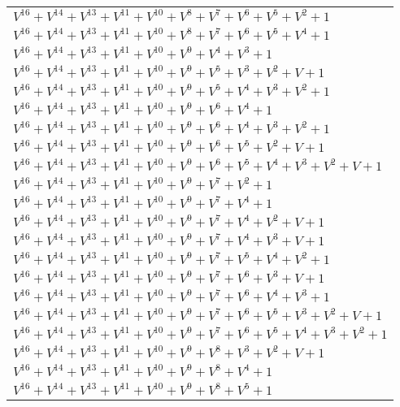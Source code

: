 \documentclass[12pt]{article}
\begin{document}
\begin{adjustwidth}{-4cm}{}
\begin{center}
\begin{longtable}{|l|}
$V^{16}  +V^{14}  +V^{13}  +V^{11}  +V^{10}  +V^{8}  +V^{7}  +V^{6}  +V^{5}  +V^{2}  + 1$ \\
$V^{16}  +V^{14}  +V^{13}  +V^{11}  +V^{10}  +V^{8}  +V^{7}  +V^{6}  +V^{5}  +V^{4}  + 1$ \\
$V^{16}  +V^{14}  +V^{13}  +V^{11}  +V^{10}  +V^{9}  +V^{4}  +V^{3}  + 1$ \\
$V^{16}  +V^{14}  +V^{13}  +V^{11}  +V^{10}  +V^{9}  +V^{5}  +V^{3}  +V^{2}  + V + 1$ \\
$V^{16}  +V^{14}  +V^{13}  +V^{11}  +V^{10}  +V^{9}  +V^{5}  +V^{4}  +V^{3}  +V^{2}  + 1$ \\
$V^{16}  +V^{14}  +V^{13}  +V^{11}  +V^{10}  +V^{9}  +V^{6}  +V^{4}  + 1$ \\
$V^{16}  +V^{14}  +V^{13}  +V^{11}  +V^{10}  +V^{9}  +V^{6}  +V^{4}  +V^{3}  +V^{2}  + 1$ \\
$V^{16}  +V^{14}  +V^{13}  +V^{11}  +V^{10}  +V^{9}  +V^{6}  +V^{5}  +V^{2}  + V + 1$ \\
$V^{16}  +V^{14}  +V^{13}  +V^{11}  +V^{10}  +V^{9}  +V^{6}  +V^{5}  +V^{4}  +V^{3}  +V^{2}  + V + 1$ \\
$V^{16}  +V^{14}  +V^{13}  +V^{11}  +V^{10}  +V^{9}  +V^{7}  +V^{2}  + 1$ \\
$V^{16}  +V^{14}  +V^{13}  +V^{11}  +V^{10}  +V^{9}  +V^{7}  +V^{4}  + 1$ \\
$V^{16}  +V^{14}  +V^{13}  +V^{11}  +V^{10}  +V^{9}  +V^{7}  +V^{4}  +V^{2}  + V + 1$ \\
$V^{16}  +V^{14}  +V^{13}  +V^{11}  +V^{10}  +V^{9}  +V^{7}  +V^{4}  +V^{3}  + V + 1$ \\
$V^{16}  +V^{14}  +V^{13}  +V^{11}  +V^{10}  +V^{9}  +V^{7}  +V^{5}  +V^{4}  +V^{2}  + 1$ \\
$V^{16}  +V^{14}  +V^{13}  +V^{11}  +V^{10}  +V^{9}  +V^{7}  +V^{6}  +V^{3}  + V + 1$ \\
$V^{16}  +V^{14}  +V^{13}  +V^{11}  +V^{10}  +V^{9}  +V^{7}  +V^{6}  +V^{4}  +V^{3}  + 1$ \\
$V^{16}  +V^{14}  +V^{13}  +V^{11}  +V^{10}  +V^{9}  +V^{7}  +V^{6}  +V^{5}  +V^{3}  +V^{2}  + V + 1$ \\
$V^{16}  +V^{14}  +V^{13}  +V^{11}  +V^{10}  +V^{9}  +V^{7}  +V^{6}  +V^{5}  +V^{4}  +V^{3}  +V^{2}  + 1$ \\
$V^{16}  +V^{14}  +V^{13}  +V^{11}  +V^{10}  +V^{9}  +V^{8}  +V^{3}  +V^{2}  + V + 1$ \\
$V^{16}  +V^{14}  +V^{13}  +V^{11}  +V^{10}  +V^{9}  +V^{8}  +V^{4}  + 1$ \\
$V^{16}  +V^{14}  +V^{13}  +V^{11}  +V^{10}  +V^{9}  +V^{8}  +V^{5}  + 1$ \\

\end{longtable}
\end{center}
\end{adjustwidth}
\end{document}
